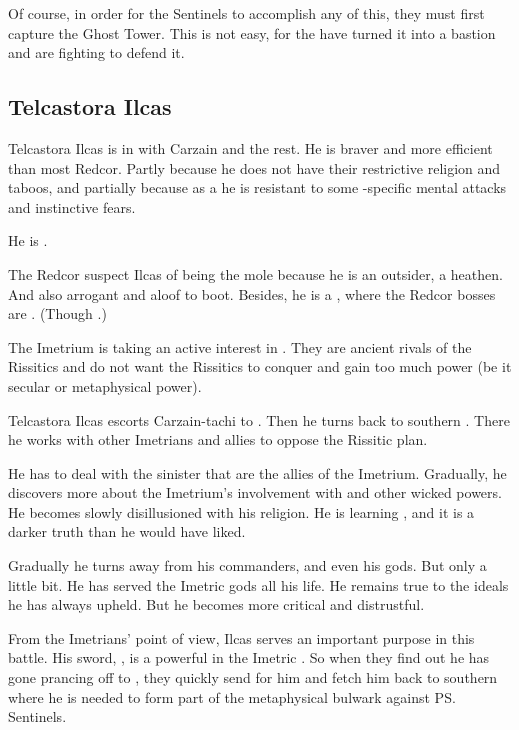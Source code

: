 Of course, in order for the Sentinels to accomplish any of this, they must first capture the Ghost Tower. 
This is not easy, for the \resphain{} have turned it into a bastion and are fighting to defend it. 






\subsection{Telcastora Ilcas}
Telcastora Ilcas is in \Redce with Carzain and the rest. 
He is braver and more efficient than most Redcor. 
Partly because he does not have their restrictive religion and taboos, and partially because as a \scatha he is resistant to some \human-specific mental attacks and instinctive fears. 

He is .

The Redcor suspect Ilcas of being the mole because he is an outsider, a heathen. 
And also arrogant and aloof to boot. 
Besides, he is a \scatha, where the Redcor bosses are \human. 
(Though .)

The Imetrium is taking an active interest in \Velcad. 
They are ancient rivals of the Rissitics and do not want the Rissitics to conquer and gain too much power (be it secular or metaphysical power). 

Telcastora Ilcas escorts Carzain-tachi to \Redce. 
Then he turns back to southern \Velcad. 
There he works with other Imetrians and allies to oppose the Rissitic plan. 

He has to deal with the sinister \nagae{} that are the allies of the Imetrium. 
Gradually, he discovers more about the Imetrium's involvement with \nagae{} and other wicked powers. 
He becomes slowly disillusioned with his religion. 
He is learning , and it is a darker truth than he would have liked. 

Gradually he turns away from his commanders, and even his gods. 
But only a little bit. 
He has served the Imetric gods all his life. 
He remains true to the ideals he has always upheld. 
But he becomes more critical and distrustful. 

From the Imetrians' point of view, Ilcas serves an important purpose in this battle. 
His sword, \Telderain, is a powerful \vertex{} in the Imetric \matrix. 
So when they find out he has gone prancing off to \Redce, they quickly send for him and fetch him back to southern \Velcad{} where he is needed to form part of the metaphysical bulwark against \ps{\Secherdamon} Sentinels. 

